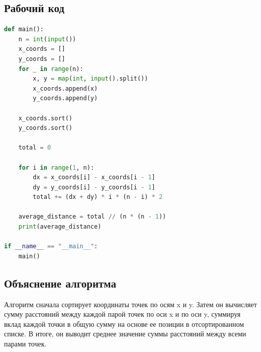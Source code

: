 \documentclass[a4paper,12pt]{article}
\begin{document}
\subsection*{Рабочий код}
\begin{lstlisting}[language=python]
def main():
    n = int(input())
    x_coords = []
    y_coords = []
    for _ in range(n):
        x, y = map(int, input().split())
        x_coords.append(x)
        y_coords.append(y)

    x_coords.sort()
    y_coords.sort()

    total = 0

    for i in range(1, n):
        dx = x_coords[i] - x_coords[i - 1]
        dy = y_coords[i] - y_coords[i - 1]
        total += (dx + dy) * i * (n - i) * 2

    average_distance = total // (n * (n - 1))
    print(average_distance)

if __name__ == "__main__":
    main()

\end{lstlisting}
\subsection*{Объяснение алгоритма}
Алгоритм сначала сортирует координаты точек по осям x и y. Затем он вычисляет сумму расстояний между каждой парой точек по оси x и по оси y, суммируя вклад каждой точки в общую сумму на основе ее позиции в отсортированном списке. В итоге, он выводит среднее значение суммы расстояний между всеми парами точек.

\newpage
\end{document}
